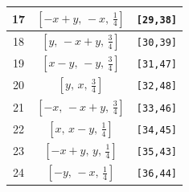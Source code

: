 \documentclass[fleqn,8pt]{jsarticle}
\begin{document}
\begin{longtable}{ccc}
17 & $\left[ - x + y,\, - x,\, \frac{1}{4} \right]$ & {\tt [29,38]} \\ \hline
18 & $\left[ y,\, - x + y,\, \frac{3}{4} \right]$ & {\tt [30,39]} \\ \hline
19 & $\left[ x - y,\, - y,\, \frac{3}{4} \right]$ & {\tt [31,47]} \\ \hline
20 & $\left[ y,\, x,\, \frac{3}{4} \right]$ & {\tt [32,48]} \\ \hline
21 & $\left[ - x,\, - x + y,\, \frac{3}{4} \right]$ & {\tt [33,46]} \\ \hline
22 & $\left[ x,\, x - y,\, \frac{1}{4} \right]$ & {\tt [34,45]} \\ \hline
23 & $\left[ - x + y,\, y,\, \frac{1}{4} \right]$ & {\tt [35,43]} \\ \hline
24 & $\left[ - y,\, - x,\, \frac{1}{4} \right]$ & {\tt [36,44]} \\
\end{longtable}
\renewcommand{\arraystretch}{1.2}
\end{document}
